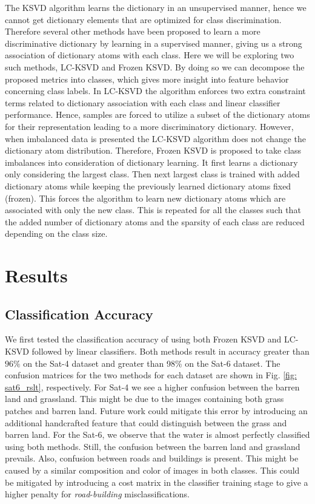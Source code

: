 The KSVD algorithm learns the dictionary in an unsupervised manner, hence we cannot get dictionary elements that are optimized for class discrimination. Therefore several other methods have been proposed to learn a more discriminative dictionary by learning in a supervised manner, giving us a strong association of dictionary atoms with each class. Here we will be exploring two such methods, LC-KSVD and Frozen KSVD. By doing so we can decompose the proposed metrics into classes, which gives more insight into feature behavior concerning class labels. In LC-KSVD the algorithm enforces two extra constraint terms related to dictionary association with each class and linear classifier performance. Hence, samples are forced to utilize a subset of the dictionary atoms for their representation leading to a more discriminatory dictionary. However, when imbalanced data is presented the LC-KSVD algorithm does not change the dictionary atom distribution. Therefore, Frozen KSVD is proposed to take class imbalances into consideration of dictionary learning. It first learns a dictionary only considering the largest class. Then next largest class is trained with added dictionary atoms while keeping the previously learned dictionary atoms fixed (frozen). This forces the algorithm to learn new dictionary atoms which are associated with only the new class. This is repeated for all the classes such that the added number of dictionary atoms and the sparsity of each class are reduced depending on the class size. 

\section{Results}

\subsection{Classification Accuracy}

We first tested the classification accuracy of using both Frozen KSVD and LC-KSVD followed by linear classifiers. Both methods result in accuracy greater than $96\%$ on the Sat-4 dataset and greater than 98\% on the Sat-6 dataset. The confusion matrices for the two methods for each dataset are shown in Fig. \ref{fig: sat6_rslt}, respectively. For Sat-4  we see a higher confusion between the barren land and grassland. This might be due to the images containing both grass patches and barren land. Future work could mitigate this error by introducing an additional handcrafted feature that could distinguish between the grass and barren land. For the Sat-6, we observe that the water is almost perfectly classified using both methods. Still, the confusion between the barren land and grassland prevails. Also, confusion between roads and buildings is present. This might be caused by a similar composition and color of images in both classes. This could be mitigated by introducing a cost matrix in the classifier training stage to give a higher penalty for \textit{road}-\textit{building} misclassifications. 

